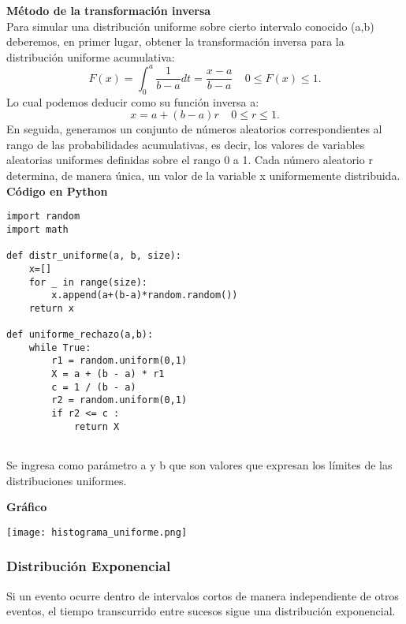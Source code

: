 \documentclass[11pt]{article}
\begin{document}
\noindent\textbf{Método de la transformación inversa}\\
  Para simular una distribución uniforme sobre cierto intervalo conocido (a,b) deberemos, en primer lugar, obtener la transformación inversa para la distribución uniforme acumulativa:
\begin{equation}
    F(x) = \int_{0}^{a}\frac{1}{b-a}dt = \frac{x-a}{b-a} \ \text{  } \ 0 \leq F(x) \leq 1.
  \end{equation}
Lo cual podemos deducir como su función inversa a:
  \begin{equation}
  x = a +(b-a)r \ \text{  }\ 0 \leq r \leq 1.
  \end{equation}
En seguida, generamos un conjunto de números aleatorios correspondientes al rango de las probabilidades acumulativas, es decir, los valores de variables aleatorias uniformes definidas sobre el rango 0 a 1. Cada número aleatorio r determina, de manera única, un valor de la variable x uniformemente distribuida.
\newpage
\noindent\textbf{Código en Python}

\begin{lstlisting}
import random
import math

def distr_uniforme(a, b, size):
    x=[]
    for _ in range(size):
        x.append(a+(b-a)*random.random())
    return x

def uniforme_rechazo(a,b):
    while True:
        r1 = random.uniform(0,1)
        X = a + (b - a) * r1
        c = 1 / (b - a)
        r2 = random.uniform(0,1) 
        if r2 <= c :
            return X
    
\end{lstlisting}
Se ingresa como parámetro a y b que son valores que expresan los límites de las distribuciones uniformes.

\noindent\textbf{Gráfico}

\begin{center}
\texttt{[image: histograma\_uniforme.png]}
\end{center}


\newpage

\subsubsection{Distribución Exponencial}

Si un evento ocurre dentro de intervalos cortos de manera independiente de otros eventos, el tiempo transcurrido entre sucesos sigue una distribución exponencial.
\end{document}
